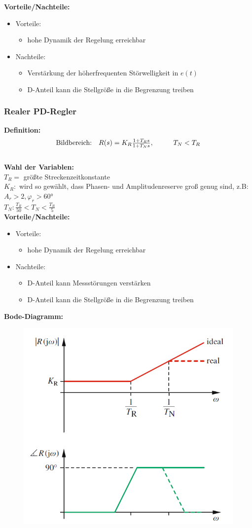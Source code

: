 \documentclass[10pt,a4paper]{article}
\newcommand{\tab}[1][1]{\hspace*{#1cm}}
\begin{document}
\textbf{Vorteile/Nachteile:}
\begin{itemize}
	\item Vorteile:
	\begin{itemize}
		\item hohe Dynamik der Regelung erreichbar
	\end{itemize}
	\item Nachteile:
	\begin{itemize}
		\item Verstärkung der höherfrequenten Störwelligkeit in $e(t)$
		\item D-Anteil kann die Stellgröße in die Begrenzung treiben
	\end{itemize}
\end{itemize}


\subsubsection{Realer PD-Regler}
\textbf{Definition:}
$$
	\begin{array}{ll}
	\text{Bildbereich:} & R(s) = K_R \frac{1 + T_R s}{1 + T_N s}, \tab T_N < T_R
	\end{array}
$$ \\

\textbf{Wahl der Variablen:} \\
$T_R=$ größte Streckenzeitkonstante  \\
$K_R:$ wird so gewählt, dass Phasen- und Amplitudenreserve groß genug sind, z.B: $A_r > 2, \varphi_r > 60°$ \\
$T_N: \frac{T_R}{50} < T_N < \frac{T_R}{5}$ \\

\textbf{Vorteile/Nachteile:}
\begin{itemize}
	\item Vorteile:
	\begin{itemize}
		\item hohe Dynamik der Regelung erreichbar
	\end{itemize}
	\item Nachteile:
	\begin{itemize}
		\item D-Anteil kann Messstörungen verstärken
		\item D-Anteil kann die Stellgröße in die Begrenzung treiben
	\end{itemize}
\end{itemize}

\textbf{Bode-Diagramm:}
\begin{figure}[H]
	\includegraphics[width = 0.4\columnwidth]{imgs/pd-regler.png}
\end{figure}
\end{document}
